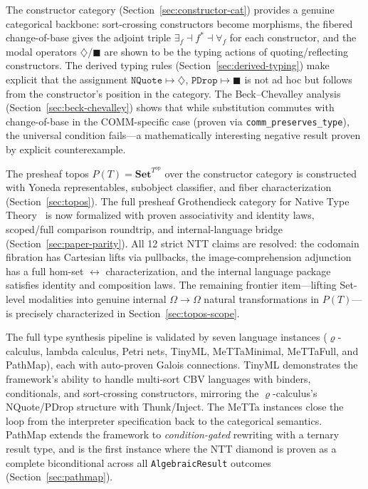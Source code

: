 \documentclass[]{article}
\newcommand{\code}[1]{\texttt{#1}}
\newcommand{\rhocalc}{\ensuremath{\varrho}}
\newcommand{\Dia}{\ensuremath{\diamondsuit}}
\newcommand{\Bx}{\ensuremath{\blacksquare}}
\begin{document}
The constructor category (Section~\ref{sec:constructor-cat}) provides a genuine
categorical backbone: sort-crossing constructors become morphisms, the fibered
change-of-base gives the adjoint triple $\exists_f \dashv f^* \dashv \forall_f$
for each constructor, and the modal operators $\Dia$/$\Bx$ are shown to be
the typing actions of quoting/reflecting constructors.  The derived typing rules
(Section~\ref{sec:derived-typing}) make explicit that the assignment
$\code{NQuote} \mapsto \Dia$, $\code{PDrop} \mapsto \Bx$ is not ad hoc but
follows from the constructor's position in the category.  The Beck--Chevalley
analysis (Section~\ref{sec:beck-chevalley}) shows that while substitution
commutes with change-of-base in the COMM-specific case (proven via
\code{comm\_preserves\_type}), the universal condition fails---a mathematically
interesting negative result proven by explicit counterexample.

The presheaf topos $P(T) = \mathbf{Set}^{T^{\mathrm{op}}}$ over the constructor
category is constructed with Yoneda representables, subobject classifier, and
fiber characterization (Section~\ref{sec:topos}).  The full presheaf Grothendieck
category for Native Type Theory~\cite{WilliamsStay2021} is now formalized with
proven associativity and identity laws, scoped/full comparison roundtrip, and
internal-language bridge (Section~\ref{sec:paper-parity}).  All 12 strict NTT
claims are resolved: the codomain fibration has Cartesian lifts via pullbacks,
the image-comprehension adjunction has a full hom-set $\leftrightarrow$
characterization, and the internal language package satisfies identity and
composition laws.  The remaining frontier item---lifting Set-level modalities
into genuine internal $\Omega \to \Omega$ natural transformations in
$P(T)$---is precisely characterized in Section~\ref{sec:topos-scope}.

The full type synthesis pipeline is validated by seven language instances
(\rhocalc{}-calculus, lambda calculus, Petri nets, TinyML, MeTTaMinimal,
MeTTaFull, and PathMap), each with auto-proven Galois connections.
TinyML demonstrates the
framework's ability to handle multi-sort CBV languages with binders, conditionals,
and sort-crossing constructors, mirroring the \rhocalc{}-calculus's
NQuote/PDrop structure with Thunk/Inject.  The MeTTa instances close the loop
from the interpreter specification back to the categorical semantics.
PathMap extends the framework to \emph{condition-gated} rewriting with a ternary
result type, and is the first instance where the NTT diamond is proven as a
complete biconditional across all \code{AlgebraicResult} outcomes (Section~\ref{sec:pathmap}).
\end{document}
